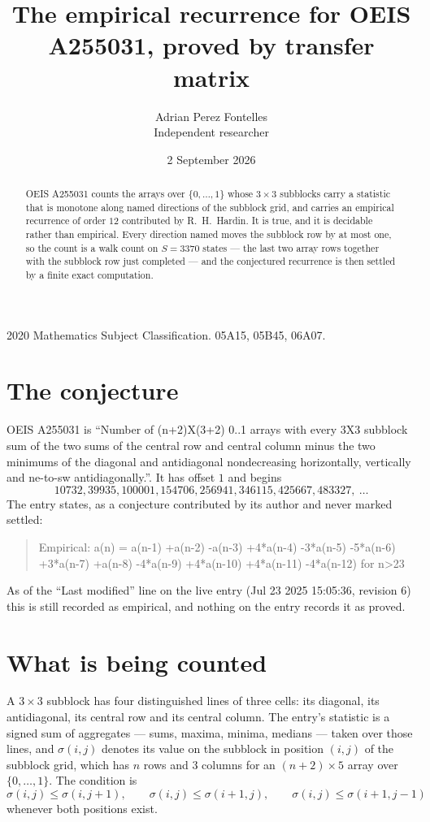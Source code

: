 \documentclass[11pt,a4paper]{article}
\title{The empirical recurrence for OEIS A255031, proved by transfer matrix}
\author{Adrian Perez Fontelles\\ \small Independent researcher}
\date{2 September 2026}
\theoremstyle{plain}
\theoremstyle{definition}
\begin{document}
\maketitle

\begin{abstract}
OEIS A255031 counts the arrays over $\{0,\dots,1\}$ whose $3\times3$ subblocks carry a
statistic that is monotone along named directions of the subblock grid, and carries an
empirical recurrence of order $12$ contributed by R.~H.~Hardin. It is true, and it is
decidable rather than empirical. Every direction named moves the subblock row by at most one,
so the count is a walk count on $S=3370$ states --- the last two array rows together with the
subblock row just completed --- and the conjectured recurrence is then settled by a finite
exact computation.
\end{abstract}

\noindent\small 2020 Mathematics Subject Classification. 05A15, 05B45, 06A07.\normalsize

\section{The conjecture}

OEIS A255031 is ``Number of (n+2)X(3+2) 0..1 arrays with every 3X3 subblock sum of the two sums of the central row and central column minus the two minimums of the diagonal and antidiagonal nondecreasing horizontally, vertically and ne-to-sw antidiagonally.''. It has offset $1$ and begins
\[
10732, 39935, 100001, 154706, 256941, 346115, 425667, 483327,\ \dots
\]
The entry states, as a conjecture contributed by its author and never marked settled:
\begin{quote}
Empirical: a(n) = a(n-1) +a(n-2) -a(n-3) +4*a(n-4) -3*a(n-5) -5*a(n-6) +3*a(n-7) +a(n-8) -4*a(n-9) +4*a(n-10) +4*a(n-11) -4*a(n-12) for n>23
\end{quote}
As of the ``Last modified'' line on the live entry (Jul 23 2025 15:05:36, revision 6) this is still
recorded as empirical, and nothing on the entry records it as proved.

\section{What is being counted}

A $3\times3$ subblock has four distinguished lines of three cells: its diagonal, its
antidiagonal, its central row and its central column. The entry's statistic is a signed sum of
aggregates --- sums, maxima, minima, medians --- taken over those lines, and $\sigma(i,j)$
denotes its value on the subblock in position $(i,j)$ of the subblock grid, which has $n$ rows
and $3$ columns for an $(n+2)\times5$ array over $\{0,\dots,1\}$. The condition is
\[
\sigma(i,j)\le\sigma(i,j+1),\qquad \sigma(i,j)\le\sigma(i+1,j),\qquad \sigma(i,j)\le\sigma(i+1,j-1)
\]
whenever both positions exist.
\end{document}
